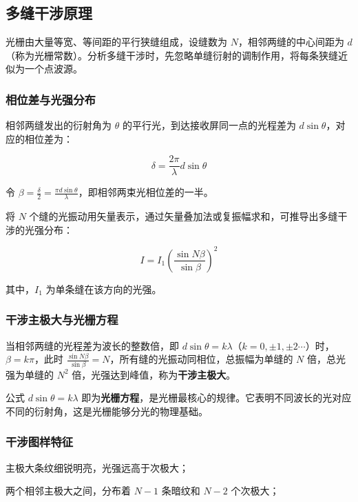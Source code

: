 \documentclass[12pt,a4paper]{ctexrep}
\begin{document}
\subsection{多缝干涉原理}

光栅由大量等宽、等间距的平行狭缝组成，设缝数为 $N$，相邻两缝的中心间距为 $d$（称为光栅常数）。分析多缝干涉时，先忽略单缝衍射的调制作用，将每条狭缝近似为一个点波源。

\subsubsection{相位差与光强分布}

相邻两缝发出的衍射角为 $\theta$ 的平行光，到达接收屏同一点的光程差为 $d\sin \theta$，对应的相位差为：

\begin{equation*}
\delta=\frac{2\pi}{\lambda}d\sin \theta
\end{equation*}

令 $\beta=\frac{\delta}{2}=\frac{\pi d\sin \theta}{\lambda}$，即相邻两束光相位差的一半。

将 $N$ 个缝的光振动用矢量表示，通过矢量叠加法或复振幅求和，可推导出多缝干涉的光强分布：

\begin{equation*}
I={I}_{1}{\left( \frac{\sin N\beta}{\sin{\beta}} \right)}^{2}
\end{equation*}

其中，${I}_{1}$ 为单条缝在该方向的光强。

\subsubsection{干涉主极大与光栅方程}

当相邻两缝的光程差为波长的整数倍，即 $d\sin \theta=k\lambda$（$k=0,\pm1,\pm2\cdots$）时，$\beta=k\pi$，此时 $\frac{\sin N\beta}{\sin{\beta}}=N$，所有缝的光振动同相位，总振幅为单缝的 $N$ 倍，总光强为单缝的 ${N}^{2}$ 倍，光强达到峰值，称为\textbf{干涉主极大}。

公式 $d\sin \theta=k\lambda$ 即为\textbf{光栅方程}，是光栅最核心的规律。它表明不同波长的光对应不同的衍射角，这是光栅能够分光的物理基础。

\subsubsection{干涉图样特征}

主极大条纹细锐明亮，光强远高于次极大；

两个相邻主极大之间，分布着 $N-1$ 条暗纹和 $N-2$ 个次极大；
\end{document}
